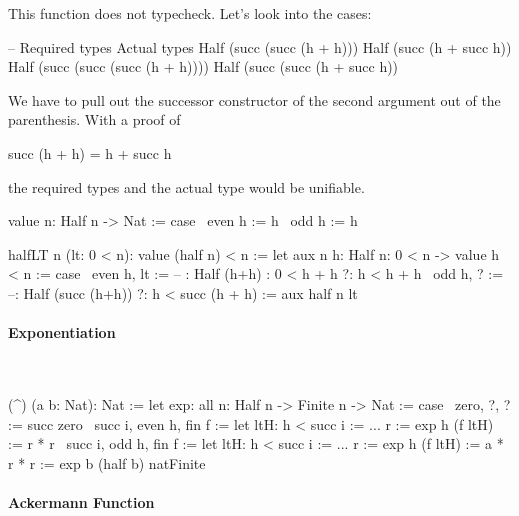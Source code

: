 This function does not typecheck. Let's look into the cases:
\begin{alba}
    --  Required types                          Actual types
        Half (succ (succ (h + h)))              Half (succ (h + succ h))
        Half (succ (succ (succ (h + h))))       Half (succ (succ (h + succ h))
\end{alba}
We have to pull out the successor constructor of the second argument out of the
parenthesis. With a proof of
\begin{alba}
    succ (h + h) = h + succ h
\end{alba}
the required types and the actual type would be unifiable.

\begin{alba}
    value {n}: Half n -> Nat := case
        \ even h := h
        \ odd  h := h

    halfLT {n} (lt: 0 < n):  value (half n) < n :=
        let
            aux {n} {h: Half n}: 0 < n  ->  value h < n := case
                \ {even h},       lt :=
                -- : Half (h+h)   : 0 < h + h
                    ?: h < h + h
                \ {odd h},              ? :=
                --: Half (succ (h+h))
                    ?: h < succ (h + h)
        := aux {half n} lt
\end{alba}






\paragraph{Exponentiation}

\ \begin{alba}
    (^) (a b: Nat): Nat :=
        let
            exp: all n: Half n -> Finite n -> Nat := case
                \ zero, ?, ? :=
                    succ zero
                \ succ i, even h, fin f :=
                    let
                        ltH: h < succ i := ...
                        r := exp h (f ltH)
                    :=
                        r * r
                \ succ i, odd h, fin f :=
                    let
                        ltH: h < succ i := ...
                        r := exp h (f ltH)
                    :=
                        a * r * r
        :=
            exp b (half b) natFinite
\end{alba}





\paragraph{Ackermann Function}

